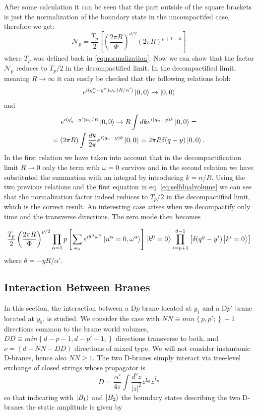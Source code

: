 After some calculation it can be seen that the part outside of the square brackets is just the normalization of the boundary state in the uncompactifed case, therefore we get:
\begin{equation}
\mathcal{N}_p = \frac{T_p}{2}\left[\left(\frac{2\pi R}{\Phi}\right)^{d/2}(2\pi R)^{p+1-d}\right]
\end{equation}
where $T_p$ was defined back in \eqref{eq:normalization}. Now we can show that the factor $\mathcal{N}_p$ reduces to $T_p/2$ in the decompactified limit. In the decompactified limit, meaning $R\rightarrow\infty$ it can easily be checked that the following relations hold:
\begin{equation}
e^{i(q_\omega^\alpha-y^\alpha)\omega_\alpha(R/\alpha')}\ket{0,0}\rightarrow\ket{0,0}
\end{equation}
and
\begin{gather}
e^{i(q_n^i-y^i)n_i/R}\ket{0,0}\rightarrow R\int{dke^{i(q_n-y)k}}\ket{0,0} =\\
=(2\pi R)\int{\frac{dk}{2\pi}e^{i(q_n-y)k}}\ket{0,0} = 2\pi R\delta(q-y)\ket{0,0}.
\end{gather}
In the first relation we have taken into account that in the decompactification limit $R\rightarrow 0$ only the term with $\omega = 0$ survives and in the second relation we have substituted the summation with an integral by introducing $k=n/R$. Using the two previous relations and the first equation in eq. \ref{eq:selfdualvolume} we can see that the normalization factor indeed reduces to $T_p/2$ in the decompactified limit, which is the correct result. An interesting case arises when we decompactify only time and the transverse directions. The zero mode then becomes

\begin{equation}
\frac{T_p}{2}\left(\frac{2\pi R}{\Phi}\right)^{p/2}\prod_{\alpha=1}{p}\left[\sum_{\omega_\alpha}e^{i\theta^\alpha\omega^\alpha}\ket{n^\alpha=0,\omega^\alpha}\right]\ket{k^0 = 0}\prod_{i=p+1}^{d-1}{\left[\delta(q^y-y^i)\ket{k^i=0}\right]}
\end{equation}
where $\theta = -yR/\alpha'$.
\subsection{Interaction Between Branes}
In this section, the interaction between a D$p$ brane located at $y_1$ and a D$p'$ brane located at $y_2$, is studied. We consider the case with $NN\equiv min\left\{p,p';\right\}+1$ directions common to the brane world volumes,\\
$DD\equiv min\left\{d-p-1,d-p'-1;\right\}$ directions transverse to both, and $\nu = \left(d-NN-DD\right)$ directions of mixed type. We will not consider instantonic D-branes, hence also $NN\geq 1$. The two D-branes simply interact via tree-level exchange of closed strings whose propagator is
\begin{equation}
	D = \frac{\alpha'}{4\pi}\int{\frac{d^2z}{|z|^2}z^{L_0}\bar{z}^{\widetilde{L_0}}}
\end{equation}
so that indicating with $\ket{B_1}$ and $\ket{B_2}$ the boundary states describing the two D-branes the static amplitude is given by


